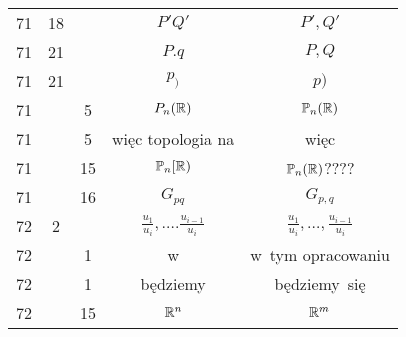 \documentclass[a4paper,11pt]{article}
\begin{document}
\begin{center}
\begin{tabular}{|c|c|c|c|c|}
    71  & 18 & & $P' Q'$ & $P', Q'$ \\
    71  & 21 & & $P.q$ & $P, Q$ \\
    71  & 21 & & $p_{ ) }$ & $p )$ \\
    71  & & \hphantom{0}5 & $P_{ n }( \mathbb{R} )$ & $\mathbb{P}_{ n }( \mathbb{R} )$ \\
    71  & & \hphantom{0}5 & więc topologia na & więc \\
    71  & & 15 & $\mathbb{P}_{ n }[ \mathbb{R} )$ & $\mathbb{P}_{ n }( \mathbb{R} )$???? \\
    71  & & 16 & $G_{ pq }$ & $G_{ p, q }$ \\
    72  & \hphantom{0}2 & & $\frac{ u_{ 1 } }{ u_{ i } }, \ldots.
                 \frac{ u_{ i - 1 } }{ u_{ i } }$
           & $\frac{ u_{ 1 } }{ u_{ i } }, \ldots,
             \frac{ u_{ i - 1 } }{ u_{ i } }$ \\
    72  & & \hphantom{0}1 & w & w~tym opracowaniu \\
    72  & & \hphantom{0}1 & będziemy & będziemy~się \\
    72  & & 15 & $\mathbb{R}^{ n }$ & $\mathbb{R}^{ m }$ \\
    \hline
  \end{tabular}





  \newpage


\end{center}
\end{document}
